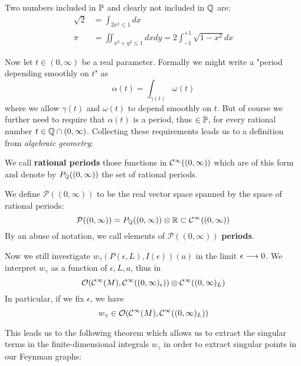 \begin{example}
  Two numbers included in $\mathbb{P}$ and clearly not included in $\mathbb{Q}$ are:
  \begin{align}
    \sqrt{2} &= \int_{2x^2 \leq 1} dx \\
    \pi &= \iint_{x^2+y^2\leq 1} dx dy = 2 \int_{-1}^{+1} \sqrt{1-x^2} dx
  \end{align}
\end{example}

Now let $t \in (0, \infty)$ be a real parameter. Formally we might write a "period depending smoothly on $t$" as
$$ \alpha(t) = \int_{\gamma(t)} \omega(t) $$
where we allow $\gamma(t)$ and $\omega(t)$ to depend smoothly on $t$. But of course we further need to require that $\alpha(t)$ is a period, thus $\in \mathbb{P}$, for every rational number $t \in \mathbb{Q} \cap (0,\infty)$. Collecting these requirements leads us to a definition from \emph{algebraic geometry}:

\begin{definition}
  We call \textbf{rational periods} those functions in $\mathcal{C}^{\infty}((0,\infty))$ which are of this form and denote by $P_{\mathbb{Q}}((0,\infty))$ the set of rational periods.
\end{definition}

\begin{definition}
  We define $\mathcal{P}((0,\infty))$ to be the real vector space spanned by the space of rational periods:
  $$ \mathcal{P}((0,\infty)) = P_{\mathbb{Q}}((0,\infty)) \otimes \mathbb{R} \subset \mathcal{C}^{\infty}((0,\infty)) $$
  By an abuse of notation, we call elements of $\mathcal{P}((0,\infty))$ \textbf{periods}.
\end{definition}

Now we still investigate $w_\gamma(P(\epsilon,L), I(\epsilon))(a)$ in the limit $\epsilon \lra 0$. We interpret $w_\gamma$ as a function of $\epsilon,L,a$, thus in
$$ \OO(\Ci(M), \Ci((0,\infty)_\epsilon)) \otimes \Ci((0,\infty)_L) $$
In particular, if we fix $\epsilon$, we have
$$ w_\gamma \in \mathcal{O}(\mathcal{C}^{\infty}(M), \mathcal{C}^{\infty}((0,\infty)_L)) $$

This leads us to the following theorem which allows us to extract the singular terms in the finite-dimensional integrals $w_\gamma$ in order to extract singular points in our Feynman graphs:

